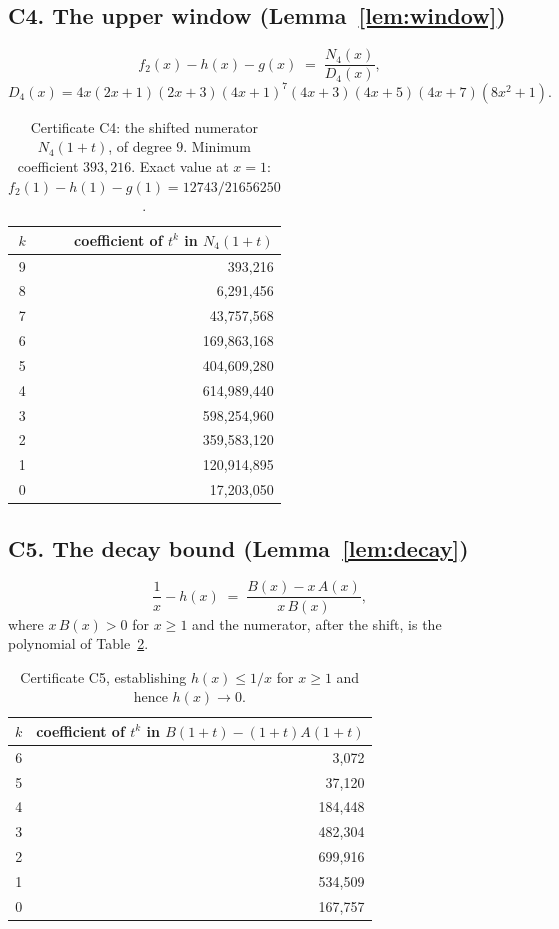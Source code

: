 \documentclass[11pt]{article}
\theoremstyle{plain}
\theoremstyle{definition}
\theoremstyle{remark}
\numberwithin{equation}{section}
\begin{document}
\subsection*{C4. The upper window (Lemma~\ref{lem:window})}

\[
  f_2(x) - h(x) - g(x) \;=\; \frac{N_4(x)}{D_4(x)},
\]
\[
  D_4(x) = 4x(2x+1)(2x+3)(4x+1)^7(4x+3)(4x+5)(4x+7)(8x^2+1).
\]

\begin{table}[ht]
\centering
\begin{tabular}{@{}rr@{}}
\toprule
$k$ & coefficient of $t^k$ in $N_4(1+t)$ \\
\midrule
9 & 393{,}216 \\
8 & 6{,}291{,}456 \\
7 & 43{,}757{,}568 \\
6 & 169{,}863{,}168 \\
5 & 404{,}609{,}280 \\
4 & 614{,}989{,}440 \\
3 & 598{,}254{,}960 \\
2 & 359{,}583{,}120 \\
1 & 120{,}914{,}895 \\
0 & 17{,}203{,}050 \\
\bottomrule
\end{tabular}
\caption{Certificate C4: the shifted numerator $N_4(1+t)$, of degree $9$. Minimum coefficient
$393{,}216$. Exact value at $x=1$: $f_2(1)-h(1)-g(1) = 12743/21656250$.}
\label{tab:C4}
\end{table}

\subsection*{C5. The decay bound (Lemma~\ref{lem:decay})}

\[
  \frac1x - h(x) \;=\; \frac{B(x) - x\,A(x)}{x\,B(x)},
\]
where $x\,B(x) > 0$ for $x \ge 1$ and the numerator, after the shift, is the polynomial of
Table~\ref{tab:C5}.

\begin{table}[ht]
\centering
\begin{tabular}{@{}rr@{}}
\toprule
$k$ & coefficient of $t^k$ in $B(1+t) - (1+t)A(1+t)$ \\
\midrule
6 & 3{,}072 \\
5 & 37{,}120 \\
4 & 184{,}448 \\
3 & 482{,}304 \\
2 & 699{,}916 \\
1 & 534{,}509 \\
0 & 167{,}757 \\
\bottomrule
\end{tabular}
\caption{Certificate C5, establishing $h(x) \le 1/x$ for $x \ge 1$ and hence $h(x) \to 0$.}
\label{tab:C5}
\end{table}
\end{document}
